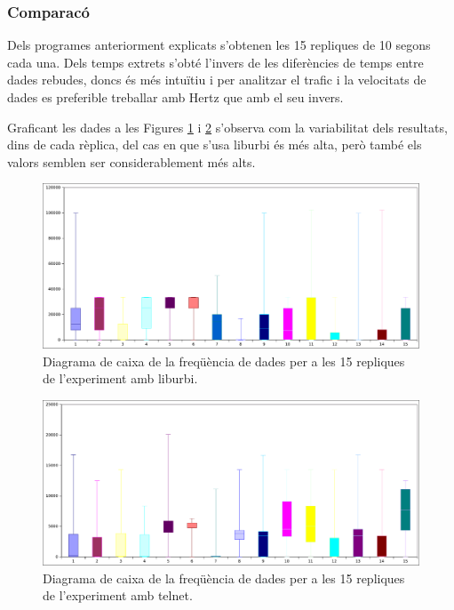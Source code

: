 \documentclass[12pt,a4paper,final,twoside]{article}
\begin{document}
\subsubsection{Comparacó}

Dels programes anteriorment explicats s'obtenen les 15 repliques de 10 segons cada una. Dels temps extrets s'obté l'invers de les diferències de temps entre dades rebudes, doncs és més intuïtiu i per analitzar el trafic i la velocitats de dades es preferible treballar amb Hertz que amb el seu invers.

Graficant les dades a les Figures \ref{fig:OneLegC++Box} i \ref{fig:OneLegPythonBox} s'observa com la variabilitat dels resultats, dins de cada rèplica, del cas en que s'usa liburbi és més alta, però també els valors semblen ser considerablement més alts. 

\begin{figure}[H]
	\centering
    \includegraphics[scale=0.5]{images/OnelegC++Box.pdf}
	 \caption{Diagrama de caixa de la freqüència de dades per a les 15 repliques de l'experiment amb liburbi.}
  \label{fig:OneLegC++Box}
\end{figure}

\begin{figure}[H]
	\centering
    \includegraphics[scale=0.5]{images/OneLegPythonBox.pdf}
	 \caption{Diagrama de caixa de la freqüència de dades per a les 15 repliques de l'experiment amb telnet.}
  \label{fig:OneLegPythonBox}
\end{figure}
\end{document}
